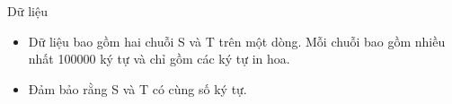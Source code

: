 Dữ liệu
\begin{itemize}
	\item     Dữ liệu bao gồm hai chuỗi S và T trên một dòng. Mỗi chuỗi bao gồm nhiều nhất 100000 ký tự và chỉ gồm các ký tự in hoa.   
	\item     Đảm bảo rằng S và T có cùng số ký tự.   
\end{itemize}